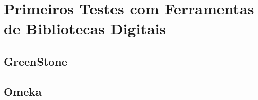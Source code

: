 \section{Primeiros Testes com Ferramentas de Bibliotecas Digitais}

\subsection{GreenStone}
\subsection{Omeka}

